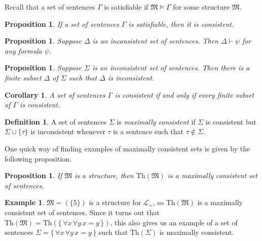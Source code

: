 \documentclass[12pt]{amsbook}
\newcommand{\proves}{\vdash}
\theoremstyle{plain}
\newtheorem{prop}[thm]{Proposition}
\newtheorem{cor}[thm]{Corollary}
\theoremstyle{definition}
\newtheorem{defn}{Definition}[chapter]
\newtheorem{exmp}{Example}[chapter]
\theoremstyle{remark}
\begin{document}
Recall that a set of sentences $\Gamma$ is satisfiable if $\mathfrak{M} \models \Gamma$ for some structure $\mathfrak{M}$.

\begin{prop} \label{p:sacon}
If a set of sentences $\Gamma$ is satisfiable,  then it is consistent.
\end{prop}

\begin{prop} \label{p:eight4}
Suppose $\Delta$ is an inconsistent set of sentences.  Then $\Delta \proves \psi$ for any formula $\psi$.
\end{prop}

\begin{prop} \label{p:eight5}
Suppose $\Sigma$ is an inconsistent set of sentences.  Then there is a finite subset $\Delta$ of $\Sigma$ such that $\Delta$ is inconsistent.
\end{prop}

\begin{cor} \label{c:eight6}
A set of sentences $\Gamma$ is consistent if and only if every finite subset of $\Gamma$ is consistent.
\end{cor}

\begin{defn}  
A set of sentences $\Sigma$ is {\em maximally consistent} if $\Sigma$ is consistent but $\Sigma \cup \{\tau\}$ is inconsistent whenever $\tau$ is a sentence such that $\tau \notin \Sigma$.
\end{defn}

One quick way of finding examples of maximally consistent sets is given by the following proposition.

\begin{prop} \label{p:smac}
If $\mathfrak{M}$ is a structure,  then $\text{Th}(\mathfrak{M})$ is a maximally consistent set of sentences.
\end{prop}

\begin{exmp} \label{e:maxcon}
$\mathfrak{M} = \left( \{ 5 \} \right)$ is a structure for $\mathcal{L}_=$,  so $\text{Th}(\mathfrak{M})$ is a maximally consistent set of sentences.  Since it turns out that $\text{Th}(\mathfrak{M}) = \text{Th}\left( \{\, \forall x\, \forall y\, x=y \,\} \right)$,  this also gives us an example of a set of sentences $\Sigma = \{\, \forall x\, \forall y\, x=y \,\}$ such that $\text{Th}(\Sigma)$ is maximally consistent.
\end{exmp}
\end{document}
